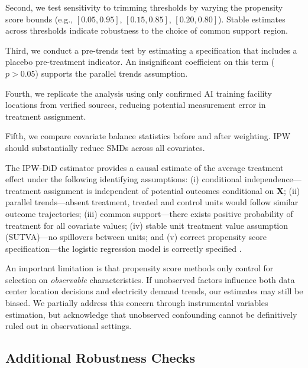 \documentclass[sigconf,authordraft]{acmart}
\begin{document}
Second, we test sensitivity to trimming thresholds by varying the propensity score bounds (e.g., $[0.05, 0.95]$, $[0.15, 0.85]$, $[0.20, 0.80]$). Stable estimates across thresholds indicate robustness to the choice of common support region.

Third, we conduct a pre-trends test by estimating a specification that includes a placebo pre-treatment indicator. An insignificant coefficient on this term ($p > 0.05$) supports the parallel trends assumption.

Fourth, we replicate the analysis using only confirmed AI training facility locations from verified sources, reducing potential measurement error in treatment assignment.

Fifth, we compare covariate balance statistics before and after weighting. IPW should substantially reduce SMDs across all covariates.

The IPW-DiD estimator provides a causal estimate of the average treatment effect under the following identifying assumptions: (i) conditional independence---treatment assignment is independent of potential outcomes conditional on $\mathbf{X}$; (ii) parallel trends---absent treatment, treated and control units would follow similar outcome trajectories; (iii) common support---there exists positive probability of treatment for all covariate values; (iv) stable unit treatment value assumption (SUTVA)---no spillovers between units; and (v) correct propensity score specification---the logistic regression model is correctly specified \citep{abadie2005semiparametric, callaway2021difference}.

An important limitation is that propensity score methods only control for selection on \emph{observable} characteristics. If unobserved factors influence both data center location decisions and electricity demand trends, our estimates may still be biased. We partially address this concern through instrumental variables estimation, but acknowledge that unobserved confounding cannot be definitively ruled out in observational settings.


\subsection{Additional Robustness Checks}\label{App:AdditionalRobustnessChecks}

\end{document}
